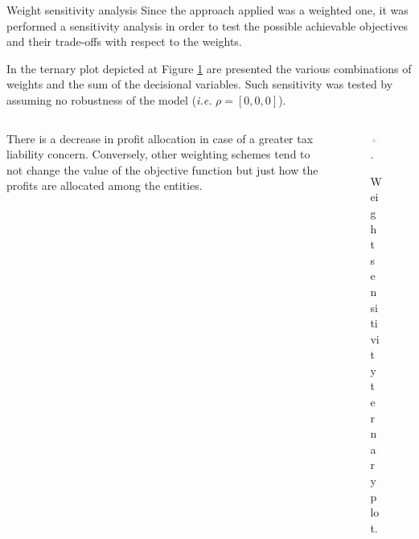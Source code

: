 \documentclass[10pt]{beamer}
\begin{document}
\begin{frame}[allowframebreaks]{Weight sensitivity analysis}
  Since the approach applied was a weighted one, it was performed a sensitivity analysis \cite{jones11} in order to test the possible achievable objectives and their trade-offs with respect to the weights.

  In the ternary plot depicted at Figure \ref{tern} are presented the various combinations of weights and the sum of the decisional variables. Such sensitivity was tested by assuming no robustness of the model (\emph{i.e.} $\rho = [0,0,0]$).

  \pagebreak
  
\begin{columns}
\begin{column}{0.4\textwidth}   
There is a decrease in profit allocation in case of a greater tax liability concern. Conversely, other weighting schemes tend to not change the value of the objective function but just how the profits are allocated among the entities.
\end{column}
\begin{column}{0.6\textwidth}

  \begin{figure}
\centering
\includegraphics[width=2.5in]{figure/ternary.png}
\DeclareGraphicsExtensions.
\caption{Weight sensitivity ternary plot.}
\label{tern}
\end{figure}

\end{column}
\end{columns}
\end{frame}
\end{document}
